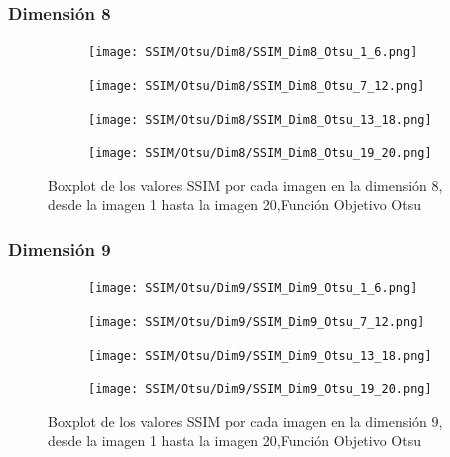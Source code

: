 \documentclass[conference]{IEEEtran}
\begin{document}
\subsubsection{Dimensión 8}
\begin{figure}
	\centering
	\begin{subfigure}{0.4\textwidth}
		\texttt{[image: SSIM/Otsu/Dim8/SSIM\_Dim8\_Otsu\_1\_6.png]}
	\end{subfigure}
	
	\begin{subfigure}{0.4\textwidth}
		\texttt{[image: SSIM/Otsu/Dim8/SSIM\_Dim8\_Otsu\_7\_12.png]}
	\end{subfigure}
	\begin{subfigure}{0.4\textwidth}
		\texttt{[image: SSIM/Otsu/Dim8/SSIM\_Dim8\_Otsu\_13\_18.png]}
	\end{subfigure}
	\begin{subfigure}{0.4\textwidth}
		\texttt{[image: SSIM/Otsu/Dim8/SSIM\_Dim8\_Otsu\_19\_20.png]}
		\vspace{-120pt} %
	\end{subfigure}
	\caption{Boxplot de los valores SSIM por cada imagen en la dimensión 8, desde la imagen 1 hasta la imagen 20,Función Objetivo Otsu}
	\label{fig:imagenes}    
\end{figure}
\subsubsection{Dimensión 9}
\begin{figure}
	\centering
	\begin{subfigure}{0.4\textwidth}
		\texttt{[image: SSIM/Otsu/Dim9/SSIM\_Dim9\_Otsu\_1\_6.png]}
	\end{subfigure}
	
	\begin{subfigure}{0.4\textwidth}
		\texttt{[image: SSIM/Otsu/Dim9/SSIM\_Dim9\_Otsu\_7\_12.png]}
	\end{subfigure}
	\begin{subfigure}{0.4\textwidth}
		\texttt{[image: SSIM/Otsu/Dim9/SSIM\_Dim9\_Otsu\_13\_18.png]}
	\end{subfigure}
	\begin{subfigure}{0.4\textwidth}
		\texttt{[image: SSIM/Otsu/Dim9/SSIM\_Dim9\_Otsu\_19\_20.png]}
		\vspace{-120pt} %
	\end{subfigure}
	\caption{Boxplot de los valores SSIM por cada imagen en la dimensión 9, desde la imagen 1 hasta la imagen 20,Función Objetivo Otsu}
	\label{fig:imagenes}    
\end{figure}
\end{document}
